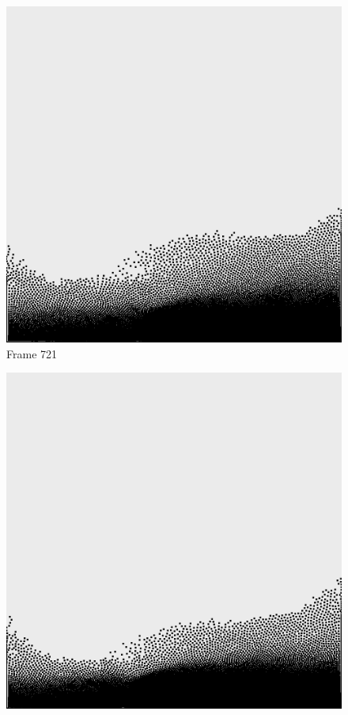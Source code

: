 \documentclass[a4paper, 12pt, oneside]{book}
\begin{document}
\begin{figure}[!ht]
    \addvspace{0.5ex}
        \begin{center}
            \includegraphics[width=\linewidth]{images/test_case_2/721.png}
            Frame 721
        \end{center}
    \endminipage
    \hfill
        \begin{center}
            \includegraphics[width=\linewidth]{images/test_case_2/741.png}

\end{center}
\end{figure}
\end{document}
